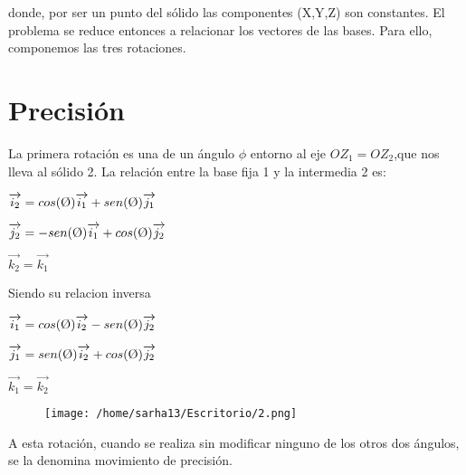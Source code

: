 \documentclass[12pt,a4paper]{report}
\begin{document}
donde, por ser un punto del sólido las componentes (X,Y,Z) son constantes. El problema se reduce entonces a relacionar los vectores de las bases. Para ello, componemos las tres rotaciones.

\section{Precisión}
La primera rotación es una de un ángulo $\phi$ entorno al eje $OZ_{1}=OZ_{2}$,que nos lleva al sólido 2. La relación entre la base fija 1 y la intermedia 2 es:
\begin{center}
 $\overrightarrow{i_{2}}=cos(\textrm \O)\overrightarrow{i_{1}}+sen(\textrm \O)\overrightarrow{j_{1}}$ 
 
 $\overrightarrow{j_{2}}=-sen(\textrm \O)\overrightarrow{i_{1}}+cos(\textrm \O)\overrightarrow{j_{2}}$
 
 $\overrightarrow{k_{2}}=\overrightarrow{k_{1}}$
 \end{center} 
Siendo su relacion inversa
\begin{center}
$\overrightarrow{i_{1}}=cos(\textrm \O)\overrightarrow{i_{2}}-sen(\textrm \O)\overrightarrow{j_{2}}$

$\overrightarrow{j_{1}}=sen(\textrm \O)\overrightarrow{i_{2}}+cos(\textrm \O)\overrightarrow{j_{2}}$

$\overrightarrow{k_{1}}=\overrightarrow{k_{2}}$
\end{center}

\begin{figure}[htp]
\centering
\texttt{[image: /home/sarha13/Escritorio/2.png]}
\caption{}
\label{}
\end{figure}

A esta rotación, cuando se realiza sin modificar ninguno de los otros dos ángulos, se la denomina movimiento de precisión.
\end{document}
